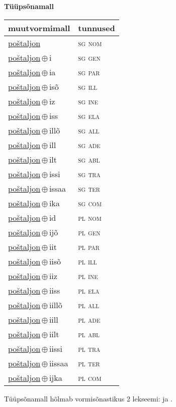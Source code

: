 

\vspace{3.5em}
\noindent \begin{minipage}{\textwidth}
\noindent \textbf{Tüüpsõnamall \,}\\

\begin{sideways}
\begin{tabular}{l l}
muutvormimall & tunnused \\
\hline
\underline{poštaljon} & \textsc{ sg nom } \\
\underline{poštaljon}\,$\oplus$\,i & \textsc{ sg gen } \\
\underline{poštaljon}\,$\oplus$\,ia & \textsc{ sg par } \\
\underline{poštaljon}\,$\oplus$\,isõ & \textsc{ sg ill } \\
\underline{poštaljon}\,$\oplus$\,iz & \textsc{ sg ine } \\
\underline{poštaljon}\,$\oplus$\,iss & \textsc{ sg ela } \\
\underline{poštaljon}\,$\oplus$\,illõ & \textsc{ sg all } \\
\underline{poštaljon}\,$\oplus$\,ill & \textsc{ sg ade } \\
\underline{poštaljon}\,$\oplus$\,ilt & \textsc{ sg abl } \\
\underline{poštaljon}\,$\oplus$\,issi & \textsc{ sg tra } \\
\underline{poštaljon}\,$\oplus$\,issaa & \textsc{ sg ter } \\
\underline{poštaljon}\,$\oplus$\,ika & \textsc{ sg com } \\
\underline{poštaljon}\,$\oplus$\,id & \textsc{ pl nom } \\
\underline{poštaljon}\,$\oplus$\,ijõ & \textsc{ pl gen } \\
\underline{poštaljon}\,$\oplus$\,iit & \textsc{ pl par } \\
\underline{poštaljon}\,$\oplus$\,iisõ & \textsc{ pl ill } \\
\underline{poštaljon}\,$\oplus$\,iiz & \textsc{ pl ine } \\
\underline{poštaljon}\,$\oplus$\,iiss & \textsc{ pl ela } \\
\underline{poštaljon}\,$\oplus$\,iillõ & \textsc{ pl all } \\
\underline{poštaljon}\,$\oplus$\,iill & \textsc{ pl ade } \\
\underline{poštaljon}\,$\oplus$\,iilt & \textsc{ pl abl } \\
\underline{poštaljon}\,$\oplus$\,iissi & \textsc{ pl tra } \\
\underline{poštaljon}\,$\oplus$\,iissaa & \textsc{ pl ter } \\
\underline{poštaljon}\,$\oplus$\,ijka & \textsc{ pl com } \\
\end{tabular}
\end{sideways}
\label{tab:tüüpsõnamall-poštaljon}

\end{minipage}

 
\vspace{1em}
\noindent Tüüpsõnamall  hõlmab vormisõnastikus 2 lekseemi:  ja .
